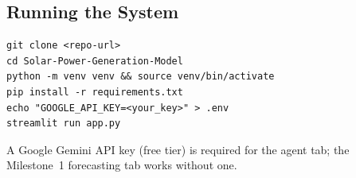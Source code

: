 \documentclass[journal,onecolumn,11pt]{IEEEtran}
\begin{document}
\subsection{Running the System}

\begin{lstlisting}[caption={Local setup.}]
git clone <repo-url>
cd Solar-Power-Generation-Model
python -m venv venv && source venv/bin/activate
pip install -r requirements.txt
echo "GOOGLE_API_KEY=<your_key>" > .env
streamlit run app.py
\end{lstlisting}

A Google Gemini API key (free tier) is required for the agent tab; the Milestone~1 forecasting tab works without one.
\end{document}
